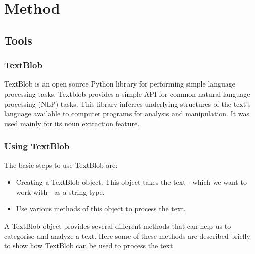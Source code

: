 \documentclass[a4paper]{article}
\begin{document}
 



\section{Method}  
\subsection{Tools}  
\subsubsection{TextBlob}

TextBlob is an open source Python library for performing simple language processing tasks. Textblob provides a simple API for common natural language processing (NLP) tasks. This library inferres underlying structures of the text's language available to computer programs for analysis and manipulation. It was used mainly for its noun extraction feature.

\subsubsection{Using TextBlob}

The basic steps to use TextBlob are:

\begin{itemize}  
\item Creating a TextBlob object. This object takes the text - which we want to work with - as a string type.
\item Use various methods of this object to process the text.
\end{itemize}

A TextBlob object provides several different methods that can help us to categorise and analyze a text. Here some of these methods are described briefly to show how TextBlob can be used to process the text. 
\end{document}
